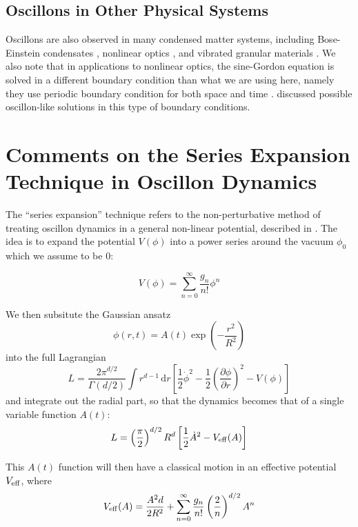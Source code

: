 \documentclass{report}
\begin{document}
\section{Oscillons in Other Physical Systems}
Oscillons are also observed in many condensed matter systems, including Bose-Einstein condensates \cite{umbanhowar1996localized}, nonlinear optics \cite{Copeland:2014qra}, and vibrated granular materials \cite{Tsimring:1997zz}. We also note that in applications to nonlinear optics, the sine-Gordon equation is solved in a different boundary condition than what we are using here, namely they use periodic boundary condition for both space and time \cite{JAWORSKI1982427, 0305-4470-15-10-015}. \cite{JAWORSKI1982427, 0305-4470-15-10-015} discussed possible oscillon-like solutions in this type of boundary conditions.

\chapter{Comments on the Series Expansion Technique in Oscillon Dynamics}
The ``series expansion'' technique refers to the non-perturbative method of treating oscillon dynamics in a general non-linear potential, described in \cite{PhysRevD.80.125037, Gleiser:2008ty}. The idea is to expand the potential $V(\phi)$ into a power series around the vacuum $\phi_0$ which we assume to be $0$:

\begin{equation}
  V(\phi)=\sum_{n=0}^\infty \frac{g_n}{n!}\phi^n
\end{equation}

We then subsitute the Gaussian ansatz
\begin{equation}
  \phi(r,t) = A(t) \exp\left(-\frac{r^2}{R^2}\right)
\end{equation}
into the full Lagrangian
\begin{equation}\label{lagfull}
    L = \frac{2\pi^{d/2}}{\Gamma(d/2)}\int r^{d-1}\,\mathrm{d}r\left[\frac{1}{2}\dot{\phi}^2 -
      \frac{1}{2}\left(\frac{\partial\phi}{\partial r}\right)^2-V(\phi)\right]
\end{equation}
and integrate out the radial part, so that the dynamics becomes that of a single variable function $A(t)$:
\begin{equation}
  L= \left(\frac{\pi}{2}\right)^{d/2}R^d\left[\frac{1}{2}\dot{A}^2 - V_{\rm eff}(A)\right]
\end{equation}

This $A(t)$ function will then have a classical motion in an effective potential $V_{\rm eff}$, where
\begin{equation}\label{effpot}
  V_{\rm eff}(A) = \frac{A^2d}{2R^2} +
  \sum_{n=0}^\infty \frac{g_n}{n!}\left(\frac{2}{n}\right)^{d/2} A^n
\end{equation}
\end{document}
